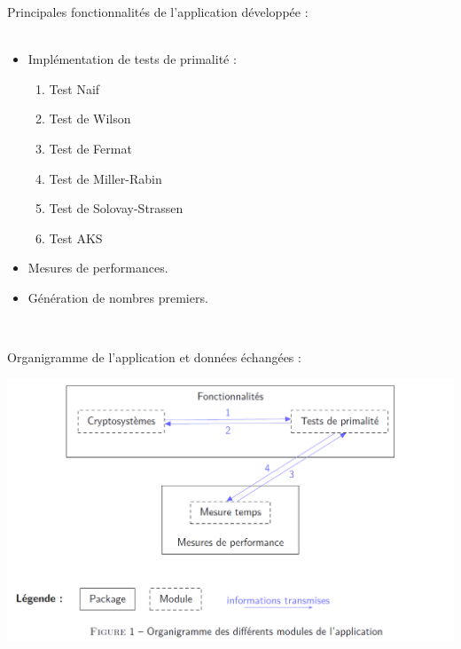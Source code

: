 		\begin{frame}
		
		Principales fonctionnalités de l'application développée :\\~\\
			\begin{itemize}
				\item Implémentation de tests de primalité :
					\begin{enumerate}
					\item Test Naif
					\item Test de Wilson
					\item Test de Fermat
					\item Test de Miller-Rabin
					\item Test de Solovay-Strassen
					\item Test AKS
					\end{enumerate}
				\item Mesures de performances.
				\item Génération de nombres premiers.
			\end{itemize}~\\
			
		\end{frame}
		\begin{frame}
		Organigramme de l'application et données échangées :\\
			\begin{center}\includegraphics[scale=0.45]{img/org.png}\end{center}
		\end{frame}

